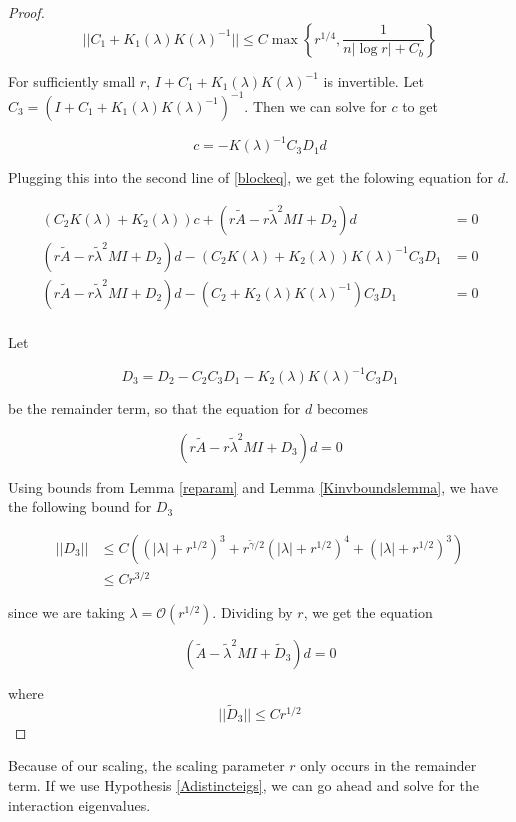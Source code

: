 \documentclass[thesis.tex]{subfiles}
\begin{document}
\begin{lemma}
\begin{proof}
\[
||C_1 + K_1(\lambda)K(\lambda)^{-1}|| \leq C \max \left\{ r^{1/4}, \frac{1}{n |\log r| + C_b } \right\}
\]

For sufficiently small $r$, $I + C_1 + K_1(\lambda)K(\lambda)^{-1}$ is invertible. Let $C_3 = (I + C_1 + K_1(\lambda)K(\lambda)^{-1})^{-1}$. Then we can solve for $c$ to get

\[
c = -K(\lambda)^{-1} C_3 D_1 d
\]

Plugging this into the second line of \eqref{blockeq}, we get the folowing equation for $d$.

\begin{align*}
(C_2 K(\lambda) + K_2(\lambda))c + (r\tilde{A} - r \tilde{\lambda}^2 MI + D_2)d &= 0 \\
(r\tilde{A} - r \tilde{\lambda}^2 MI + D_2)d - (C_2 K(\lambda) + K_2(\lambda))K(\lambda)^{-1} C_3 D_1 &= 0 \\
(r\tilde{A} - r \tilde{\lambda}^2 MI + D_2)d - (C_2 + K_2(\lambda)K(\lambda)^{-1}) C_3 D_1 &= 0 \\
\end{align*}

Let 

\[
D_3 = D_2 - C_2 C_3 D_1 - K_2(\lambda) K(\lambda)^{-1} C_3 D_1
\]

be the remainder term, so that the equation for $d$ becomes

\[
(r\tilde{A} - r \tilde{\lambda}^2 MI + D_3)d = 0
\]

Using bounds from Lemma \ref{reparam} and Lemma \ref{Kinvboundslemma}, we have the following bound for $D_3$

\begin{align*}
||D_3|| &\leq C \left( (|\lambda| + r^{1/2})^3 + r^{\tilde{\gamma}/2}(|\lambda| + r^{1/2})^4 + (|\lambda| + r^{1/2})^3 \right) \\
&\leq C r^{3/2}
\end{align*}

since we are taking $\lambda = \mathcal{O}(r^{1/2})$. Dividing by $r$, we get the equation 

\[
(\tilde{A} - \tilde{\lambda}^2 MI + \tilde{D}_3)d = 0
\]

where 
\[
||\tilde{D}_3|| \leq C r^{1/2}
\]

\end{proof}
\end{lemma}

Because of our scaling, the scaling parameter $r$ only occurs in the remainder term. If we use Hypothesis \ref{Adistincteigs}, we can go ahead and solve for the interaction eigenvalues.
\end{document}
